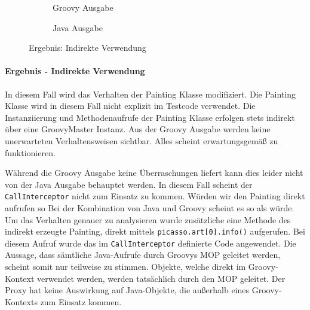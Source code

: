 

\begin{figure}[t!]
	\begin{subfigure}{\textwidth}
		
		\caption{Groovy Ausgabe}
		\label{fig:proxres-indirect-groovy}
	\end{subfigure}
	
	\begin{subfigure}{\textwidth}
		
		\caption{Java Ausgabe}
		\label{fig:proxres-indirect-java}
	\end{subfigure}
	
	\caption{Ergebnis: Indirekte Verwendung}
	\label{fig:proxres-indirect}
\end{figure}


\paragraph{Ergebnis - Indirekte Verwendung}
In diesem Fall wird das Verhalten der Painting Klasse modifiziert.
Die Painting Klasse wird in diesem Fall nicht explizit im Testcode verwendet.
Die Instanziierung und Methodenaufrufe der Painting Klasse erfolgen stets indirekt über eine GroovyMaster Instanz.
Aus der Groovy Ausgabe werden keine unerwarteten Verhaltensweisen sichtbar.
Alles scheint erwartungsgemäß zu  funktionieren.

Während die Groovy Ausgabe keine Überraschungen liefert kann dies leider nicht von der Java Ausgabe behauptet werden. 
In diesem Fall scheint der \texttt{CallInterceptor} nicht zum Einsatz zu kommen.
Würden wir den Painting direkt aufrufen so 
Bei der Kombination von Java und Groovy scheint es so als würde.
Um das Verhalten genauer zu analysieren wurde zusätzliche eine Methode des indirekt erzeugte Painting, direkt mittels \texttt{picasso.art[0].info()} aufgerufen.
Bei diesem Aufruf wurde das im \texttt{CallInterceptor} definierte Code angewendet.
Die Aussage, dass sämtliche Java-Aufrufe durch Groovys MOP geleitet werden, scheint somit nur teilweise zu stimmen.
Objekte, welche direkt im Groovy-Kontext verwendet werden, werden tatsächlich durch den MOP geleitet.
Der Proxy hat keine Auswirkung auf Java-Objekte, die außerhalb eines Groovy-Kontexts zum Einsatz kommen.



